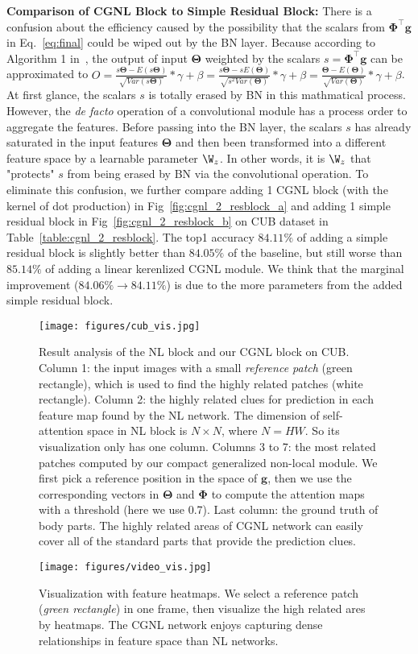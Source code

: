 \documentclass{article}
\begin{document}
\textbf{Comparison of CGNL Block to Simple Residual Block:}
There is a confusion about the efficiency caused by the possibility that the scalars from $\bm{\Phi}^\top \bm{g}$ in Eq.~\ref{eq:final} could be wiped out by the BN layer.
Because according to Algorithm 1 in~\cite{bn}, the output of input $\bm{\Theta}$ weighted by the scalars $s=\bm{\Phi}^\top \bm{g}$ can be approximated to
$O=\frac{s\bm{\Theta}-E(s\bm{\Theta})}{\sqrt{Var(s\bm{\Theta})}} * \gamma + \beta
  =\frac{s\bm{\Theta}-sE(\bm{\Theta})}{\sqrt{s^2Var(\bm{\Theta})}} * \gamma + \beta
  =\frac{\bm{\Theta}-E(\bm{\Theta})}{\sqrt{Var(\bm{\Theta})}} * \gamma + \beta$.
At first glance, the scalars $s$ is totally erased by BN in this mathmatical process.
However, the \emph{de facto} operation of a convolutional module has a process order to aggregate the features.
Before passing into the BN layer, the scalars $s$ has already saturated in the input features $\bm{\Theta}$ and then been transformed into a different feature space by a learnable parameter $\W_z$.
In other words, it is $\W_z$ that "protects" $s$ from being erased by BN via the convolutional operation.
To eliminate this confusion, we further compare adding 1 CGNL block (with the kernel of dot production) in Fig~\ref{fig:cgnl_2_resblock_a} and adding 1 simple residual block in Fig~\ref{fig:cgnl_2_resblock_b} on CUB dataset in Table~\ref{table:cgnl_2_resblock}.
The top1 accuracy $84.11\%$ of adding a simple residual block is slightly better than $84.05\%$ of the baseline, but still worse than $85.14\%$ of adding a linear kerenlized CGNL module.
We think that the marginal improvement ($84.06\%\rightarrow84.11\%$) is due to the more parameters from the added simple residual block.

\begin{figure}[ht]
\centering
\texttt{[image: figures/cub\_vis.jpg]}
\caption{\small{
  Result analysis of the NL block and our CGNL block on CUB.
  Column 1: the input images with a small \emph{reference patch} (green rectangle), which is used to find the highly related patches (white rectangle).
  Column 2: the highly related clues for prediction in each feature map found by the NL network.
  The dimension of self-attention space in NL block is $N \times N$, where $N=HW$.
  So its visualization only has one column.
  Columns 3 to 7: the most related patches computed by our compact generalized non-local module.
  We first pick a reference position in the space of $\bm{g}$, then we use the corresponding vectors in $\bm{\Theta}$ and $\bm{\Phi}$ to compute the attention maps with a threshold (here we use 0.7).
  Last column: the ground truth of body parts.
  The highly related areas of CGNL network can easily cover all of the standard parts that provide the prediction clues.
}}
\label{fig:cub visualization}
\end{figure}
\begin{figure}[ht]
\centering
\texttt{[image: figures/video\_vis.jpg]}
\caption{\small{
  Visualization with feature heatmaps. We select a reference patch (\emph{green rectangle}) in one frame, then visualize the high related ares by heatmaps. The CGNL network enjoys capturing dense relationships in feature space than NL networks.
}}
\label{fig:video visualization}
\end{figure}
\end{document}
